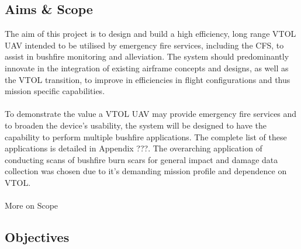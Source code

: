 \subsection{Aims \& Scope}
The aim of this project is to design and build a high efficiency, long range VTOL UAV intended to be utilised by emergency fire services, including the CFS, to assist in bushfire monitoring and alleviation. The system should predominantly innovate in the integration of existing airframe concepts and designs, as well as the VTOL transition, to improve in efficiencies in flight configurations and thus mission specific capabilities.\\ 
\\
To demonstrate the value a VTOL UAV may provide emergency fire services and to broaden the device’s usability, the system will be designed to have the capability to perform multiple bushfire applications. The complete list of these applications is detailed in Appendix ???. The overarching application of conducting scans of bushfire burn scars for general impact and damage data collection was chosen due to it's demanding mission profile and dependence on VTOL. \\
\\
More on Scope

\subsection{Objectives}

